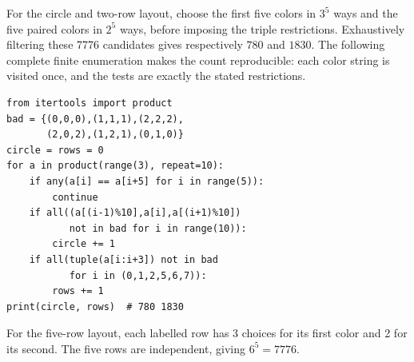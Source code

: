 For the circle and two-row layout, choose the first five colors in $3^5$ ways and the five paired colors in $2^5$ ways, before imposing the triple restrictions. Exhaustively filtering these 7776 candidates gives respectively $\boxed{780}$ and $\boxed{1830}$. The following complete finite enumeration makes the count reproducible: each color string is visited once, and the tests are exactly the stated restrictions.\begin{verbatim}
from itertools import product
bad = {(0,0,0),(1,1,1),(2,2,2),
       (2,0,2),(1,2,1),(0,1,0)}
circle = rows = 0
for a in product(range(3), repeat=10):
    if any(a[i] == a[i+5] for i in range(5)):
        continue
    if all((a[(i-1)%10],a[i],a[(i+1)%10])
           not in bad for i in range(10)):
        circle += 1
    if all(tuple(a[i:i+3]) not in bad
           for i in (0,1,2,5,6,7)):
        rows += 1
print(circle, rows)  # 780 1830
\end{verbatim}
For the five-row layout, each labelled row has 3 choices for its first color and 2 for its second. The five rows are independent, giving $6^5=\boxed{7776}$.
